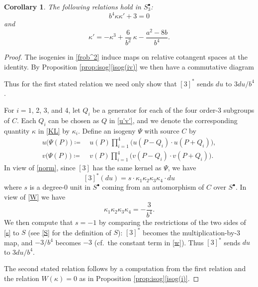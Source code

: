 \documentclass{gtpart}
\newtheorem{cor}[thm]{Corollary}
\theoremstyle{definition}
\theoremstyle{remark}
\newcommand{\K}{\kappa}
\newcommand{\s}{S^\bullet}
\newcommand{\isog}[1]{Proposition \ref{prop:isog}\thinspace \eqref{isog(#1)}}
\begin{document}
\begin{cor}
\label{cor:K'}
 The following relations hold in $\s_3$: 
 \[
  b^4 \K \K' + 3 = 0 
 \]
 and 
 \[
  \K' = -\K^3 + \frac{6}{b^2} ~ \K - \frac{a^2 - 8 b}{b^4}.  
 \]
\end{cor}
\begin{proof}
 The isogenies in \eqref{frob^2} induce maps on relative cotangent 
 spaces at the identity.  By \isog{iv} we then have a commutative 
 diagram 
 \begin{center}
 \end{center}
 Thus for the first stated relation we need only show that $[3]^*$ sends 
 $du$ to $3 du / b^4$.  

 For $i = 1$, 2, 3, and 4, let $Q_i$ be a generator for each of the four 
 order-3 subgroups of $C$.  Each $Q_i$ can be chosen as $Q$ in 
 \eqref{u'v'}, and we denote the corresponding quantity $\K$ in 
 \eqref{KL} by $\K_i$.  Define an isogeny $\Psi$ with source $C$ by 
 \begin{equation*}
 \begin{split}
  u\big( \Psi(P) \big) \coloneqq & ~ u(P) \prod_{i=1}^4 \big( u(P-Q_i) \cdot u(P+Q_i) \big), \\
  v\big( \Psi(P) \big) \coloneqq & ~ v(P) \prod_{i=1}^4 \big( v(P-Q_i) \cdot v(P+Q_i) \big).  
 \end{split}
 \end{equation*}
 In view of \eqref{norm}, since $[3]$ has the same kernel as $\Psi$, we 
 have 
 \begin{equation}
 \label{s}
  [3]^* (du) = s \cdot \K_1 \K_2 \K_3 \K_4 \cdot du 
 \end{equation}
 where $s$ is a degree-0 unit in $\s$ coming from an automorphism of $C$ 
 over $\s$.  In view of \eqref{W} we have 
 \[
  \K_1 \K_2 \K_3 \K_4 = -\frac{3}{b^4}.  
 \]
 We then compute that $s = -1$ by comparing the restrictions of the two 
 sides of \eqref{s} to $S$ (see \eqref{S} for the definition of $S$): 
 $[3]^*$ becomes the multiplication-by-3 map, and $-3 / b^4$ becomes 
 $-3$ (cf.~the constant term in \eqref{w}).  Thus $[3]^*$ sends $du$ to 
 $3 du / b^4$.  

 The second stated relation follows by a computation from the first 
 relation and the relation $W(\K) = 0$ as in \isog{i}.  
\end{proof}
\end{document}
